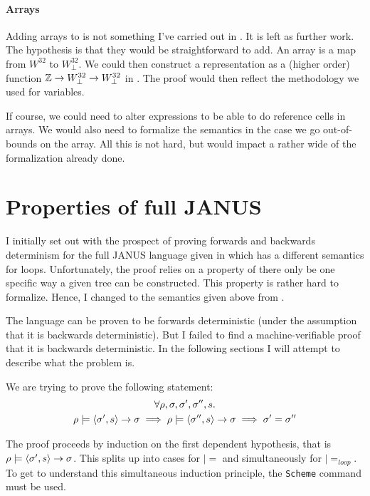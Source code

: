 \paragraph{Arrays}

Adding arrays to \januso{} is not something I've carried out in
\coq{}. It is left as further work. The hypothesis is that they would
be straightforward to add. An array is a map from $W^{32}$ to
$W^{32}_{\perp}$. We could then construct a representation as a
(higher order) function $\mathbb{Z} \to W^{32}_{\perp} \to W^{32}_{\perp}$ in
\coq{}. The proof would then reflect the methodology we used for
variables.

If course, we could need to alter expressions to be able to do
reference cells in arrays. We would also need to formalize the
semantics in the case we go out-of-bounds on the array. All this is
not hard, but would impact a rather wide of the formalization already
done.

\section{Properties of full JANUS}
\label{sec:prop-full-janus}

I initially set out with the prospect of proving forwards and
backwards determinism for the full JANUS language given in
\cite{yokoyama.gluck:reversible} which has a different semantics for
loops. Unfortunately, the proof relies on a property of there only be
one specific way a given tree can be constructed. This property is
rather hard to formalize. Hence, I changed to the semantics given
above from \cite{yokoyama.axelsen.ea:principles}.

The language can be proven to be forwards deterministic (under the
assumption that it is backwards deterministic). But I failed to find a
machine-verifiable proof that it is backwards deterministic. In the
following sections I will attempt to describe what the problem is.

We are trying to prove the following statement:
\begin{multline*}
  \forall \rho, \sigma, \sigma', \sigma'', s . \\
  \rho |= \langle \sigma', s \rangle -> \sigma \implies \rho |=
  \langle \sigma'', s \rangle -> \sigma \implies \sigma' = \sigma''
\end{multline*}

The proof proceeds by induction on the first dependent hypothesis,
that is $\rho |= \langle \sigma', s \rangle -> \sigma$. This splits up into
cases for $|=$ and simultaneously for $|=_{loop}$. To get \coq{} to
understand this simultaneous induction principle, the \texttt{Scheme}
command must be used.

